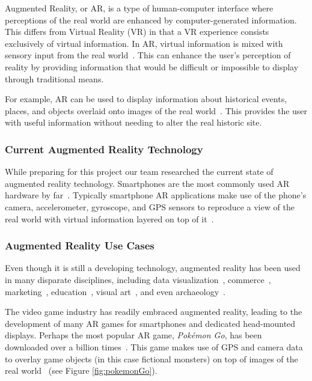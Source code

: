 \documentclass[a4paper, 10pt, american, titlepage]{article}
\begin{document}
Augmented Reality, or AR, is a type of human-computer interface where
perceptions of the real world are enhanced by computer-generated information.
This differs from Virtual Reality (VR) in that a VR experience consists
exclusively of virtual information. In AR, virtual information is mixed with
sensory input from the real world~\autocite{carmigniani2011}. This can enhance
the user's perception of reality by providing information that would be
difficult or impossible to display through traditional means.

For example, AR can be used to display information about historical events,
places, and objects overlaid onto images of the real
world~\autocite{saenz2009}.  This provides the user with useful information
without needing to alter the real historic site.

\subsubsection{Current Augmented Reality Technology}
\label{sec:currentAugmentedRealityTechnology}

While preparing for this project our team researched the current state of
augmented reality technology. Smartphones are the most commonly used AR hardware
by far~\autocite{boland2018}. Typically smartphone AR applications make use of
the phone's camera, accelerometer, gyroscope, and GPS sensors to reproduce a
view of the real world with virtual information layered on top of
it~\autocite{bonsor2018}.

\subsubsection{Augmented Reality Use Cases}
\label{sec:augmentedRealityUseCases}

Even though it is still a developing technology, augmented reality has been used
in many disparate disciplines, including data
visualization~\autocite{resnick2017}, commerce~\autocite{matney2018},
marketing~\autocite{sharma2015}, education~\autocite{stewart-smith2012}, visual
art~\autocite{katz2018}, and even archaeology~\autocite{eve2012}.

The video game industry has readily embraced augmented reality, leading to the
development of many AR games for smartphones and dedicated head-mounted
displays. Perhaps the most popular AR game, \textit{Pokémon Go}, has been
downloaded over a billion times~\autocite{webster2018}. This game makes use of
GPS and camera data to overlay game objects (in this case fictional monsters) on
top of images of the real world~\autocite{concepcion2016} (see Figure
\ref{fig:pokemonGo}).
\end{document}
